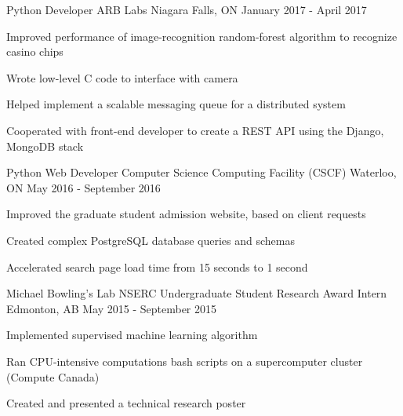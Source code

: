

\addvspace{1ex}

\begin{cventries}


\cventry
{Python Developer} %
{ARB Labs} %
{Niagara Falls, ON} %
{January 2017 - April 2017} %
{ %
\begin{cvitems}
\item {Improved performance of image-recognition random-forest algorithm to recognize casino chips}
\item {Wrote low-level C code to interface with camera}
\item {Helped implement a scalable messaging queue for a distributed system }
\item {Cooperated with front-end developer to create a REST API using the Django, MongoDB stack}
\end{cvitems}
}



\cventry
{Python Web Developer} %
{Computer Science Computing Facility (CSCF)} %
{Waterloo, ON} %
{May 2016 - September 2016} %
{ %
\begin{cvitems}
\item {Improved the graduate student admission website, based on client requests}
\item {Created complex PostgreSQL database queries and schemas}
\item {Accelerated search page load time from 15 seconds to 1 second}
\end{cvitems}
}



\cventry
{Michael Bowling's Lab} %
{NSERC Undergraduate Student Research Award Intern} %
{Edmonton, AB} %
{May 2015 - September 2015} %
{ %
\begin{cvitems}
\item {Implemented supervised machine learning algorithm}
\item {Ran CPU-intensive computations bash scripts on a supercomputer cluster (Compute Canada)}
\item {Created and presented a technical research poster}
\end{cvitems}
}


\end{cventries}
